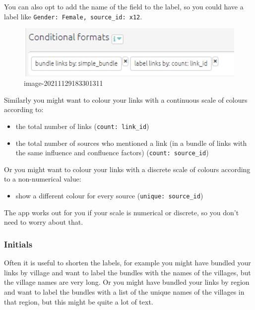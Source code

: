 \documentclass[
]{book}
\providecommand{\tightlist}{%
  \setlength{\itemsep}{0pt}\setlength{\parskip}{0pt}}
\begin{document}
You can also opt to add the name of the field to the label, so you could have a label like \texttt{Gender:\ Female,\ source\_id:\ x12}.

\begin{figure}
\centering
\includegraphics[width=6.77083in,height=\textheight]{_assets/image-20211129183301311.png}
\caption{image-20211129183301311}
\end{figure}

Similarly you might want to colour your links with a continuous scale of colours according to:

\begin{itemize}
\tightlist
\item
  the total number of links (\texttt{count:\ link\_id})
\item
  the total number of sources who mentioned a link (in a bundle of links with the same influence and confluence factors) (\texttt{count:\ source\_id})
\end{itemize}

Or you might want to colour your links with a discrete scale of colours according to a non-numerical value:

\begin{itemize}
\tightlist
\item
  show a different colour for every source (\texttt{unique:\ source\_id})
\end{itemize}

The app works out for you if your scale is numerical or discrete, so you don't need to worry about that.

\hypertarget{xinitials}{%
\subsubsection{Initials}\label{xinitials}}

Often it is useful to shorten the labels, for example you might have bundled your links by village and want to label the bundles with the names of the villages, but the village names are very long. Or you might have bundled your links by region and want to label the bundles with a list of the unique names of the villages in that region, but this might be quite a lot of text.
\end{document}
